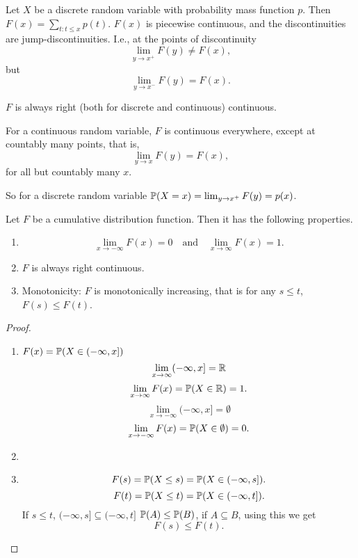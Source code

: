 \documentclass[10pt, a4paper]{article}
\begin{document}
\begin{theorem}
    Let $X$ be a discrete random variable with probability mass function $p$.
    Then $F(x) = \sum_{t : t \leq x}p(t)$.
    $F(x)$ is piecewise continuous,
    and the discontinuities are jump-discontinuities.
    I.e.,
    at the points of discontinuity
    \[
    \lim_{y \rightarrow x^{+}}F(y) \neq F(x),
    \]
    but
    \[
    \lim_{y \rightarrow x ^ {-}}F(y) = F(x).
    \]
\end{theorem}
$F$ is always right (both for discrete and continuous) continuous.

For a continuous random variable,
$F$ is continuous everywhere,
except at countably many points,
that is,
\[
\lim_{y \rightarrow x}F(y) = F(x),
\]
for all but countably many $x$.

So for a discrete random variable $\P(X = x) = \lim_{y \rightarrow x ^ {+}}F(y) = p(x)$.

\begin{theorem}
    Let $F$ be a cumulative distribution function.
    Then it has the following properties.
    \begin{enumerate}[label = (\roman*)]
        \item
        \[
        \lim_{x \rightarrow -\infty}F(x) = 0
        \quad\text{and}\quad
        \lim_{x \rightarrow \infty}F(x) = 1.
        \]
        \item $F$ is always right continuous.
        \item Monotonicity: $F$ is monotonically increasing,
        that is for any $s \leq t$,
        $F(s) \leq F(t)$.
    \end{enumerate}
    \begin{proof}\phantom{}
    \begin{enumerate}[label = (\roman*)]
        \item $F(x) = \P(X \in (-\infty, x])$
        \[
        \lim_{x \rightarrow \infty}(-\infty, x] = \R
        \]
        \[
        \lim_{x \rightarrow \infty}F(x) = \P(X \in \R) = 1.
        \]
        \[
        \lim_{x \rightarrow -\infty}(-\infty, x] = \emptyset
        \]
        \[
        \lim_{x \rightarrow -\infty}F(x) = \P(X \in \emptyset) = 0.
        \]
        \item \phantom{}
        \item 
        \[
        F(s) = \P(X \leq s) = \P(X \in (-\infty, s]).
        \]
        \[
        F(t) = \P(X \leq t) = \P(X \in (-\infty, t]).
        \]
        If $s \leq t$,
        $(-\infty, s] \subseteq (-\infty, t]$
        $\P(A) \leq \P(B)$,
        if $A \subseteq B$,
        using this we get
        \[
        F(s) \leq F(t).
        \]
    \end{enumerate}
    \end{proof}
\end{theorem}
\end{document}
